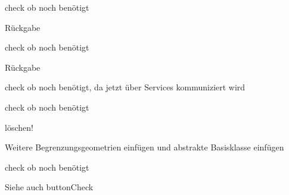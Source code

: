 
\begin{DoxyRefList}
\item[\label{todo__todo000008}%
\hypertarget{todo__todo000008}{}%
Element \hyperlink{classGeometricKinematic_a2780149e9cc27767a216952be3c4efa1}{Geometric\-Kinematic\-:\-:get\-T\-\_\-0\-\_\-\-F\-L} ()]check ob noch benötigt \begin{DoxyReturn}{Rückgabe}

\end{DoxyReturn}

\item[\label{todo__todo000009}%
\hypertarget{todo__todo000009}{}%
Element \hyperlink{classGeometricKinematic_af17c2b463d3fa83ec26fb4b4d5abb64c}{Geometric\-Kinematic\-:\-:get\-T\-\_\-0\-\_\-\-Q4} ()]check ob noch benötigt \begin{DoxyReturn}{Rückgabe}

\end{DoxyReturn}

\item[\label{todo__todo000010}%
\hypertarget{todo__todo000010}{}%
Element \hyperlink{classGeometricKinematic_a985dc4eb67fb7989226d5b8d0ed2f9bf}{Geometric\-Kinematic\-:\-:set\-Angles} (const Eigen\-::\-Vector\-Xd value)]check ob noch benötigt, da jetzt über Services kommuniziert wird  
\item[\label{todo__todo000001}%
\hypertarget{todo__todo000001}{}%
Element \hyperlink{classGeometricKinematicCommander_afbfee50f578ff4098026413f41b916a3}{Geometric\-Kinematic\-Commander\-:\-:velocity\-\_\-} ]check ob noch benötigt  
\item[\label{todo__todo000002}%
\hypertarget{todo__todo000002}{}%
Element \hyperlink{classICommander_a01ec4010dc037bfb600cee7f0be9311c}{I\-Commander\-:\-:aperture\-Limit} ]löschen!  
\item[\label{todo__todo000006}%
\hypertarget{todo__todo000006}{}%
Element \hyperlink{classICommander_ab0d02021fcc73daaebcfe0a826e15f50}{I\-Commander\-:\-:bounding\-Box} ]Weitere Begrenzungsgeometrien einfügen und abstrakte Basisklasse einfügen  
\item[\label{todo__todo000004}%
\hypertarget{todo__todo000004}{}%
Element \hyperlink{classICommander_a038f78434eb525d73414c84624d3c3e4}{I\-Commander\-:\-:buttons} ]check ob noch benötigt \begin{DoxySeeAlso}{Siehe auch}
button\-Check  
\end{DoxySeeAlso}


\end{DoxyRefList}
